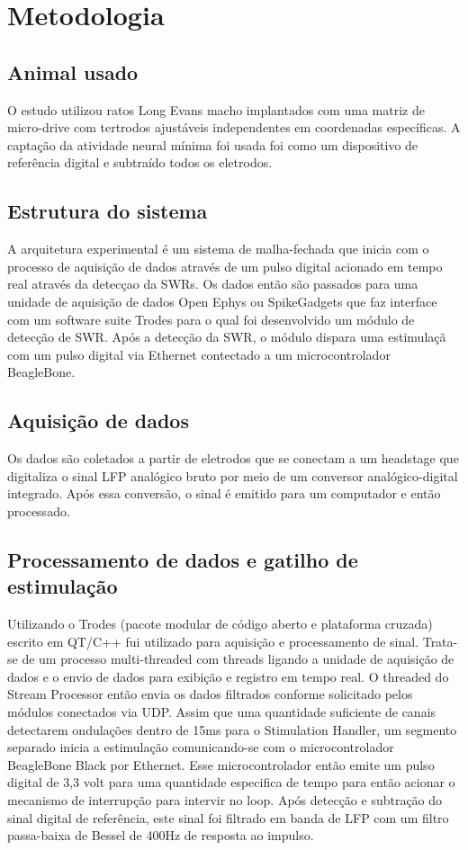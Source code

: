 \documentclass{IEEEtran}
\begin{document}
\section{Metodologia}
\subsection{Animal usado}
O estudo utilizou ratos Long Evans macho implantados com uma matriz de micro-drive com tertrodos ajustáveis independentes em coordenadas específicas. A captação da atividade neural mínima foi usada foi como um dispositivo de referência digital e subtraído todos os eletrodos.

\subsection{Estrutura do sistema}
A arquitetura experimental é um sistema de malha-fechada que inicia com o processo de aquisição de dados através de um pulso digital acionado em tempo real através da detecçao da SWRs. Os dados então são passados para uma unidade de aquisição de dados Open Ephys ou SpikeGadgets que faz interface com um software suite Trodes para o qual foi desenvolvido um módulo de detecção de SWR. Após a detecção da SWR, o módulo dispara uma estimulaçã com um pulso digital via Ethernet contectado a um microcontrolador BeagleBone.

\subsection{Aquisição de dados}
Os dados são coletados a partir de eletrodos que se conectam a um headstage que digitaliza o sinal LFP analógico bruto por meio de um conversor analógico-digital integrado. Após essa conversão, o sinal é emitido para um computador e então processado. 

\subsection{Processamento de dados e gatilho de estimulação}
Utilizando o Trodes (pacote modular de código aberto e plataforma cruzada) escrito em QT/C++ fui utilizado para aquisição e processamento de sinal. Trata-se de um processo multi-threaded com threads ligando a unidade de aquisição de dados e o envio de dados para exibição e registro em tempo real. O threaded do Stream Processor então envia os dados filtrados conforme solicitado pelos módulos conectados via UDP. Assim que uma quantidade suficiente de canais detectarem ondulações dentro de 15ms para o Stimulation Handler, um segmento separado inicia a estimulação comunicando-se com o microcontrolador BeagleBone Black por Ethernet. Esse microcontrolador então emite um pulso digital de 3,3 volt para uma quantidade especifica de tempo para então acionar o mecanismo de interrupção para intervir no loop. Após detecção e subtração do sinal digital de referência, este sinal foi filtrado em banda de LFP com um filtro passa-baixa de Bessel de 400Hz de resposta ao impulso.
\end{document}
